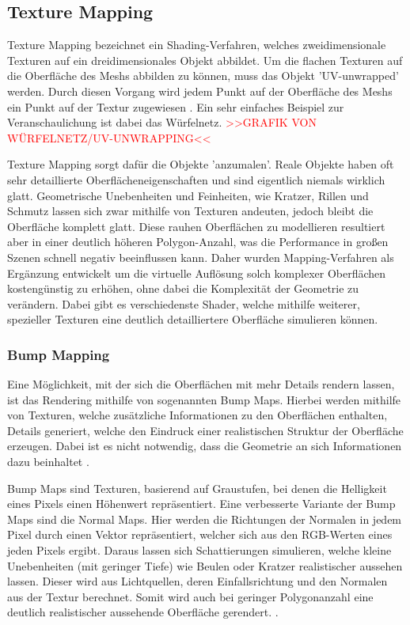 \subsection{Texture Mapping}

Texture Mapping bezeichnet ein Shading-Verfahren, welches zweidimensionale Texturen auf ein dreidimensionales Objekt
abbildet. Um die flachen Texturen auf die Oberfläche des Meshs abbilden zu können, muss das Objekt 'UV-unwrapped' werden.
Durch diesen Vorgang wird jedem Punkt auf der Oberfläche des Meshs ein Punkt auf der Textur zugewiesen \parencite{Catmull1974} \parencite{Blinn1976}.
Ein sehr einfaches Beispiel zur Veranschaulichung ist dabei das Würfelnetz.
\textcolor{red}{>>GRAFIK VON WÜRFELNETZ/UV-UNWRAPPING<<}

Texture Mapping sorgt dafür die Objekte 'anzumalen'.
Reale Objekte haben oft sehr detaillierte Oberflächeneigenschaften und sind eigentlich niemals wirklich glatt.
Geometrische Unebenheiten und Feinheiten, wie Kratzer, Rillen und Schmutz lassen sich zwar mithilfe von
Texturen andeuten, jedoch bleibt die Oberfläche komplett glatt. Diese rauhen Oberflächen zu modellieren resultiert
aber in einer deutlich höheren Polygon-Anzahl, was die Performance in großen Szenen schnell negativ beeinflussen kann.
Daher wurden Mapping-Verfahren als Ergänzung entwickelt um die virtuelle Auflösung
solch komplexer Oberflächen kostengünstig zu erhöhen, ohne dabei die Komplexität der Geometrie zu verändern.
Dabei gibt es verschiedenste Shader, welche mithilfe weiterer, spezieller Texturen eine deutlich detailliertere
Oberfläche simulieren können.


\subsubsection{Bump Mapping}

Eine Möglichkeit, mit der sich die Oberflächen mit mehr Details rendern lassen, ist das Rendering
mithilfe von sogenannten Bump Maps.
Hierbei werden mithilfe von Texturen, welche zusätzliche Informationen zu den Oberflächen enthalten,
Details generiert, welche den Eindruck einer realistischen Struktur der Oberfläche erzeugen. 
Dabei ist es nicht notwendig, dass die Geometrie an sich Informationen dazu beinhaltet \parencite{Blinn1978}.

Bump Maps sind Texturen, basierend auf Graustufen, bei denen die Helligkeit eines Pixels 
einen Höhenwert repräsentiert. Eine verbesserte Variante der Bump Maps sind die Normal Maps.
Hier werden die Richtungen der Normalen in jedem Pixel durch einen Vektor repräsentiert, 
welcher sich aus den RGB-Werten eines jeden Pixels ergibt. Daraus lassen sich Schattierungen simulieren,
welche kleine Unebenheiten (mit geringer Tiefe) wie Beulen oder Kratzer realistischer aussehen lassen. 
Dieser wird aus Lichtquellen, deren Einfallsrichtung und den Normalen aus der Textur berechnet. 
Somit wird auch bei geringer Polygonanzahl eine deutlich realistischer aussehende Oberfläche gerendert. 
\parencite{Cohen1998}.

